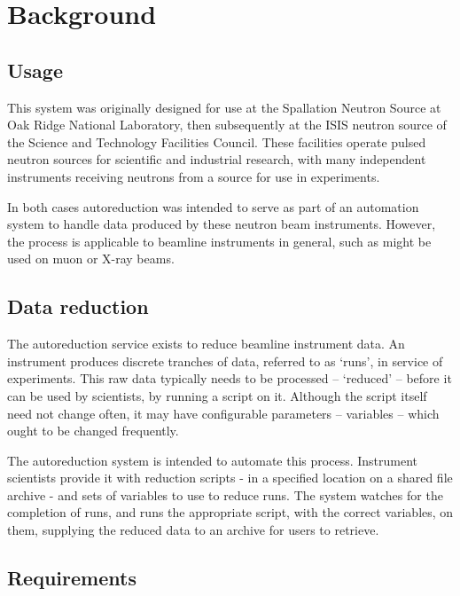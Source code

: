 \documentclass[twocolumn]{article}
\date{}
\begin{document}
\section{Background}\label{background}

\subsection{Usage}\label{usage}

This system was originally designed for use at the Spallation Neutron
Source at Oak Ridge National Laboratory, then subsequently at the ISIS
neutron source of the Science and Technology Facilities Council. These
facilities operate pulsed neutron sources for scientific and industrial
research, with many independent instruments receiving neutrons from a
source for use in experiments.

In both cases autoreduction was intended to serve as part of an
automation system to handle data produced by these neutron beam
instruments. However, the process is applicable to beamline instruments
in general, such as might be used on muon or X-ray beams.

\subsection{Data reduction}\label{data-reduction}

The autoreduction service exists to reduce beamline instrument data. An
instrument produces discrete tranches of data, referred to as `runs', in
service of experiments. This raw data typically needs to be processed --
`reduced' -- before it can be used by scientists, by running a script on
it. Although the script itself need not change often, it may have
configurable parameters -- variables -- which ought to be changed
frequently.

The autoreduction system is intended to automate this process.
Instrument scientists provide it with reduction scripts - in a specified
location on a shared file archive - and sets of variables to use to
reduce runs. The system watches for the completion of runs, and runs the
appropriate script, with the correct variables, on them, supplying the
reduced data to an archive for users to retrieve.

\subsection{Requirements}\label{requirements}
\end{document}
